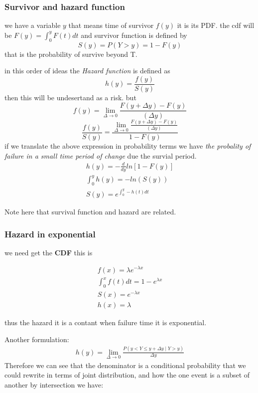 \documentclass[10pt,a4paper]{article}
\begin{document}
\subsubsection{Survivor and hazard function}
we have a variable $y$ that means time of survivor $f(y)$  it is its PDF.
the cdf will be  $F(y)=\int_{0}^{y} F(t)dt$
and survivor function is defined by 
$$S(y)=P(Y>y)= 1-F(y)$$ 
that is the probability of survive beyond T.

in this order of ideas the \textit{Hazard function } is defined as 
$$ h(y)=\frac{f(y)}{S(y)}$$
then this will be undesertand as a risk.
but 
$$ f(y)=   \lim_{\Delta \to 0}   \frac{   F(y + \Delta y) - F(y)}{(\Delta y)}$$
$$\frac{f(y)}{S(y)}= \frac{\lim_{\Delta \to 0}   \frac{ F(y + \Delta y) - F(y)}{(\Delta y)}}{1-F(y)}$$
if we translate the above expression in probability terms we have \textit{ the probality of failure in a small time period of change} due the survial period.
\begin{eqnarray}
 h(y) =-\frac{d}{dy}ln[1-F(y)] \\
\int_{0}^{y} h(y) = -ln(S(y)) \\
S(y)=e^{\int_{0}^{y} -h(t) dt}
\label{hazard-survival}
\end{eqnarray}

Note here that survival function and hazard are related.



\subsubsection{Hazard in exponential}
we need get the \textbf{CDF} this is 

\begin{eqnarray*}
f(x)=\lambda e^{- \lambda x }   \\
\int_{0}^{x} f(t)dt= 1 - e^{\lambda x} \\
S(x)=e^{-\lambda x} \\
h(x)= \lambda
\end{eqnarray*}

thus the hazard it is a contant when failure time it is exponential.

Another formulation:
\begin{equation}
\begin{align*}
h(y) = \lim_{\Delta \to 0}   \frac{P(y<  Y \leq y + \Delta y  \mid Y > y )}{\Delta y}
\end{align*}
\end{equation}
Therefore we can see that the denominator is a conditional probability that we could rewrite in terms of joint distribution, and how the one event is a subset of another by intersection we have:
\end{document}
